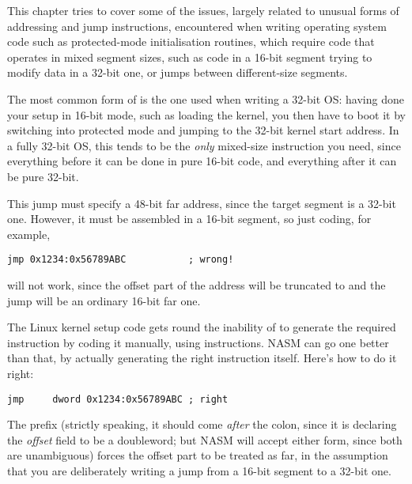 %
%

This chapter tries to cover some of the issues, largely related to
unusual forms of addressing and jump instructions, encountered when
writing operating system code such as protected-mode initialisation
routines, which require code that operates in mixed segment sizes,
such as code in a 16-bit segment trying to modify data in a 32-bit
one, or jumps between different-size segments.


The most common form of  is the one
used when writing a 32-bit OS: having done your setup in 16-bit mode,
such as loading the kernel, you then have to boot it by switching into
protected mode and jumping to the 32-bit kernel start address. In a
fully 32-bit OS, this tends to be the \emph{only} mixed-size
instruction you need, since everything before it can be done in pure
16-bit code, and everything after it can be pure 32-bit.

This jump must specify a 48-bit far address, since the target
segment is a 32-bit one. However, it must be assembled in a 16-bit
segment, so just coding, for example,

\begin{lstlisting}
jmp 0x1234:0x56789ABC           ; wrong!
\end{lstlisting}

will not work, since the offset part of the address will be
truncated to  and the jump will be an ordinary 16-bit far
one.

The Linux kernel setup code gets round the inability of  to
generate the required instruction by coding it manually, using
 instructions. NASM can go one better than that, by actually
generating the right instruction itself. Here's how to do it right:

\begin{lstlisting}
jmp     dword 0x1234:0x56789ABC ; right
\end{lstlisting}

The  prefix (strictly speaking,
it should come \emph{after} the colon, since it is declaring the
\emph{offset} field to be a doubleword; but NASM will accept either
form, since both are unambiguous) forces the offset part to be treated
as far, in the assumption that you are deliberately writing a jump from
a 16-bit segment to a 32-bit one.

